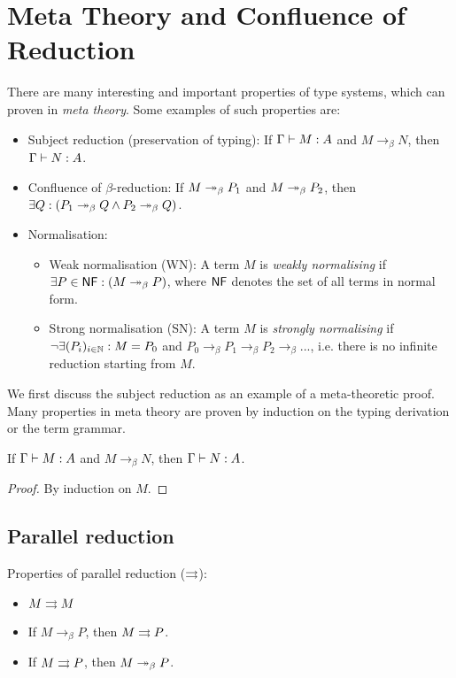 \section{Meta Theory and Confluence of Reduction}
There are many interesting and important properties of type systems,
which can proven in \emph{meta theory}.
Some examples of such properties are:
\begin{itemize}
    \item Subject reduction (preservation of typing):
            If $\Gamma \vdash M : A$ and $M \to_\beta N$, then $\Gamma \vdash N : A$.
    \item Confluence of $\beta$-reduction:
            If $M \twoheadrightarrow_\beta P_1$ and $M \twoheadrightarrow_\beta P_2$, then $\exists Q: (P_1 \twoheadrightarrow_\beta Q \land P_2 \twoheadrightarrow_\beta Q)$.
    \item Normalisation:
    \begin{itemize}
        \item Weak normalisation (WN): A term $M$ is \emph{weakly normalising} if $\exists P \in \textsf{NF}: (M \twoheadrightarrow_\beta P)$,
                where $\textsf{NF}$ denotes the set of all terms in normal form.
        \item Strong normalisation (SN): A term $M$ is \emph{strongly normalising} if
                $\neg \exists (P_i)_{i \in \mathbb{N}}: M = P_0$ and $P_0 \to_\beta P_1 \to_\beta P_2 \to_\beta ...$,
                i.e. there is no infinite reduction starting from $M$.
    \end{itemize}
\end{itemize}

We first discuss the subject reduction as an example of a meta-theoretic proof.
Many properties in meta theory are proven by induction on the typing derivation or the
term grammar.

\begin{lemma*}
    \upshape If $ \Gamma \vdash M : A$ and $M \to_\beta N$, then $\Gamma \vdash N : A$.
\end{lemma*}
\begin{proof}
    By induction on $M$.
\end{proof}

\subsection{Parallel reduction}
Properties of parallel reduction ($\rightrightarrows$):
\begin{itemize}
    \item $M \rightrightarrows M$
    \item If $M \to_\beta P$, then $M \rightrightarrows P$.
    \item If $M \rightrightarrows P$, then $M \twoheadrightarrow_\beta P$.
\end{itemize}
